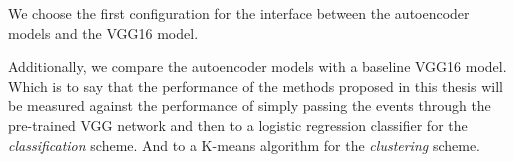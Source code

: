 We choose the first configuration for the interface between the autoencoder models and the VGG16 model. 

Additionally, we compare the autoencoder models with a baseline VGG16 model. Which is to say that the performance of the methods proposed in this thesis will be measured against the performance of simply passing the events through the pre-trained VGG network and then to a logistic regression classifier for the \textit{classification} scheme. And to a K-means algorithm for the \textit{clustering} scheme.